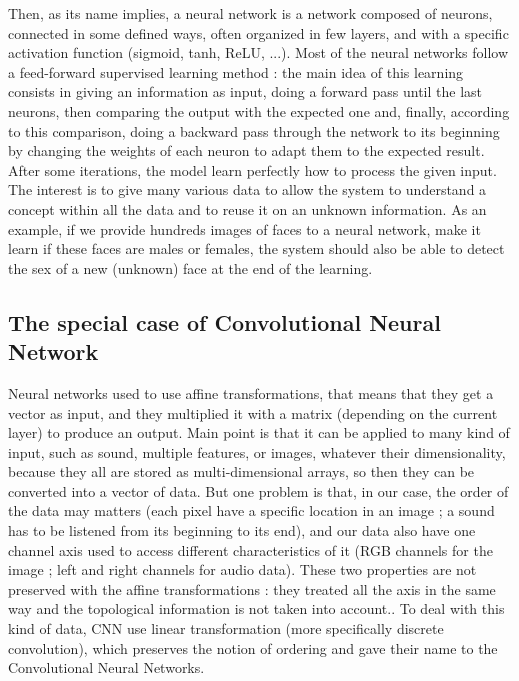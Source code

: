 Then, as its name implies, a neural network is a network composed of neurons, connected in some defined ways, often organized in few layers, and with a specific activation function (sigmoid, tanh, ReLU, ...). Most of the neural networks follow a feed-forward supervised learning method : the main idea of this learning consists in giving an information as input, doing a forward pass until the last neurons, then comparing the output with the expected one and, finally, according to this comparison, doing a backward pass through the network to its beginning by changing the weights of each neuron to adapt them to the expected result. After some iterations, the model learn perfectly how to process the given input. The interest is to give many various data to allow the system to understand a concept within all the data and to reuse it on an unknown information. As an example, if we provide hundreds images of faces to a neural network, make it learn if these faces are males or females, the system should also be able to detect the sex of a new (unknown) face at the end of the learning.


\subsection{The special case of Convolutional Neural Network} \label{1:overview:special_case}
Neural networks used to use affine transformations, that means that they get a vector as input, and they multiplied it with a matrix (depending on the current layer) to produce an output. Main point is that it can be applied to many kind of input, such as sound, multiple features, or images, whatever their dimensionality, because they all are stored as multi-dimensional arrays, so then they can be converted into a vector of data. But one problem is that, in our case, the order of the data may matters (each pixel have a specific location in an image ; a sound has to be listened from its beginning to its end), and our data also have one channel axis used to access different characteristics of it (RGB channels for the image ; left and right channels for audio data). These two properties are not preserved with the affine transformations : they treated all the axis in the same way and the topological information is not taken into account.. To deal with this kind of data, CNN use linear transformation (more specifically discrete convolution), which preserves the notion of ordering and gave their name to the Convolutional Neural Networks.

